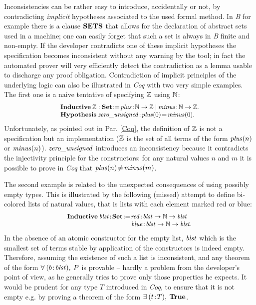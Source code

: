 \documentclass[conference]{IEEEtran}
\begin{document}
Inconsistencies can be rather easy to introduce, accidentally or not, by contradicting
\emph{implicit} hypotheses associated to the used formal method. In \emph{B} for example there
is a clause {\small$\mathbf{SETS}$} that allows for the declaration of abstract sets used in a
machine; one can easily forget that such a set is always in \emph{B} finite and non-empty. If
the developer contradicts one of these implicit hypotheses the specification becomes
inconsistent without any warning by the tool; in fact the automated prover will very
efficiently detect the contradiction as a lemma usable to discharge any proof obligation.
Contradiction of implicit principles of the underlying logic can also be illustrated in
\emph{Coq} with two very simple examples. The first one is a naive tentative of specifying
{\small$\mathbb{Z}$} using {\small$\mathbb{N}$}:
\[\small\begin{array}{l}
\Cmd{Inductive}\:\REL:\Cmd{Set}\!:=\!
\fid{plus}\!:\!\NAT\to\REL\:|\:\fid{minus}\!:\!\NAT\to\REL.\\
\Cmd{Hypothesis}\:\fid{zero\_unsigned}\!:\!\fid{plus}(0)\!=\!\fid{minus}(0).
\end{array}\]
Unfortunately, as pointed out in Par. \ref{Coq}, the definition of {\small$\mathbb{Z}$} is not a
specification but an implementation ({\small$\mathbb{Z}$} is the set of all terms of the form
{\small$\textrm{\emph{plus}}(n)$} or {\small$\textrm{\emph{minus}}(n)$}). {\small$\textrm{\emph{zero\_unsigned}}$}
introduces an inconsistency because it contradicts the injectivity principle for the
constructors: for any natural values {\small$n$} and {\small$m$} it is possible to prove in
\emph{Coq} that {\small$\textrm{\emph{plus}}(n)\!\not=\!\textrm{\emph{minus}}(m)$}.

The second example is related to the unexpected consequences of using possibly empty types.
This is illustrated by the following (missed) attempt to define bi-colored lists of natural
values, that is lists with each element marked red or blue:
\[\small\begin{array}{l}
\Cmd{Inductive}\:\fid{blst}\!:\!\Cmd{Set}\!:=\!\fid{red}\!:\!\fid{blst}\to\NAT\to\fid{blst}\\
\quad\quad\quad\quad\quad\quad\quad\quad\quad\:\:
|\:\fid{blue}\!:\!\fid{blst}\to\NAT\to\fid{blst}.
\end{array}\]
In the absence of an atomic constructor for the empty list, {\small$\textrm{\emph{blst}}$} which is the
smallest set of terms stable by application of the constructors is indeed empty. Therefore,
assuming the existence of such a list is inconsistent, and any theorem of the form
{\small$\forall\:(b\!:\!\textrm{\emph{blst}}),\:P$} is provable -- hardly a problem from the developer's
point of view, as he generally tries to prove only those properties he expects. It would be
prudent for any type {\small$T$} introduced in \emph{Coq}, to ensure that it is not empty e.g.
by proving a theorem of the form {\small$\exists\:(t\!:\!T),\:\mathbf{True}$}.
\end{document}
